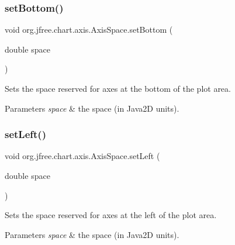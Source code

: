 \subsubsection{\texorpdfstring{set\+Bottom()}{setBottom()}}
{\footnotesize\ttfamily void org.\+jfree.\+chart.\+axis.\+Axis\+Space.\+set\+Bottom (\begin{DoxyParamCaption}\item[{double}]{space }\end{DoxyParamCaption})}

Sets the space reserved for axes at the bottom of the plot area.


\begin{DoxyParams}{Parameters}
{\em space} & the space (in Java2D units). \\
\hline
\end{DoxyParams}
\mbox{\label{classorg_1_1jfree_1_1chart_1_1axis_1_1_axis_space_af2f580ae0f26771ce996d73d82830628}} 
\subsubsection{\texorpdfstring{set\+Left()}{setLeft()}}
{\footnotesize\ttfamily void org.\+jfree.\+chart.\+axis.\+Axis\+Space.\+set\+Left (\begin{DoxyParamCaption}\item[{double}]{space }\end{DoxyParamCaption})}

Sets the space reserved for axes at the left of the plot area.


\begin{DoxyParams}{Parameters}
{\em space} & the space (in Java2D units). \\
\hline
\end{DoxyParams}
\mbox{\label{classorg_1_1jfree_1_1chart_1_1axis_1_1_axis_space_a6a385c00f056d34d36d1332821ef81c1}} 
